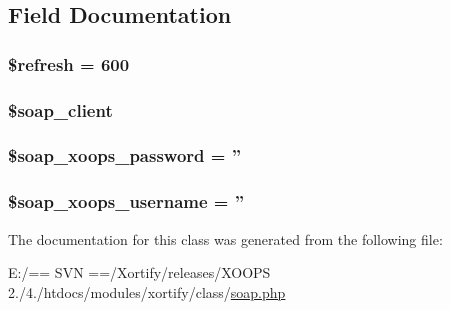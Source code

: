 \subsection{Field Documentation}
\hypertarget{class_s_o_a_p_xortify_exchange_a8527f826b6959aaa92b0e51ee427ba1a}{
\subsubsection[{\$refresh}]{\setlength{\rightskip}{0pt plus 5cm}\$refresh = 600}}\label{class_s_o_a_p_xortify_exchange_a8527f826b6959aaa92b0e51ee427ba1a}
\hypertarget{class_s_o_a_p_xortify_exchange_a18c3d5ef7b606d5f21c8fda9d08e8c7e}{
\subsubsection[{\$soap\-\_\-client}]{\setlength{\rightskip}{0pt plus 5cm}\$soap\-\_\-client}}\label{class_s_o_a_p_xortify_exchange_a18c3d5ef7b606d5f21c8fda9d08e8c7e}
\hypertarget{class_s_o_a_p_xortify_exchange_ac116a126fa48c572acc0a859f42fa8dc}{
\subsubsection[{\$soap\-\_\-xoops\-\_\-password}]{\setlength{\rightskip}{0pt plus 5cm}\$soap\-\_\-xoops\-\_\-password = ''}}\label{class_s_o_a_p_xortify_exchange_ac116a126fa48c572acc0a859f42fa8dc}
\hypertarget{class_s_o_a_p_xortify_exchange_ab46ae973f580890282bce8dbe346abab}{
\subsubsection[{\$soap\-\_\-xoops\-\_\-username}]{\setlength{\rightskip}{0pt plus 5cm}\$soap\-\_\-xoops\-\_\-username = ''}}\label{class_s_o_a_p_xortify_exchange_ab46ae973f580890282bce8dbe346abab}


The documentation for this class was generated from the following file\-:\begin{DoxyCompactItemize}
\item 
E\-:/== S\-V\-N ==/\-Xortify/releases/\-X\-O\-O\-P\-S 2./4./htdocs/modules/xortify/class/\hyperlink{soap_8php}{soap.\-php}\end{DoxyCompactItemize}
